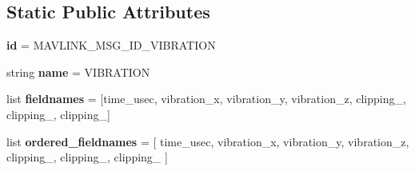 \subsection*{Static Public Attributes}
\begin{DoxyCompactItemize}
\item 
\mbox{\label{classpymavlink_1_1dialects_1_1v10_1_1MAVLink__vibration__message_aae3f0ffb631fe4f4b68b9c84e67de39c}} 
{\bfseries id} = M\+A\+V\+L\+I\+N\+K\+\_\+\+M\+S\+G\+\_\+\+I\+D\+\_\+\+V\+I\+B\+R\+A\+T\+I\+ON
\item 
\mbox{\label{classpymavlink_1_1dialects_1_1v10_1_1MAVLink__vibration__message_a869eb6823984ad248c9239fb7b1ba8c0}} 
string {\bfseries name} = \textquotesingle{}V\+I\+B\+R\+A\+T\+I\+ON\textquotesingle{}
\item 
\mbox{\label{classpymavlink_1_1dialects_1_1v10_1_1MAVLink__vibration__message_a4001662f3370f6ffdb24feb94920ec90}} 
list {\bfseries fieldnames} = \mbox{[}\textquotesingle{}time\+\_\+usec\textquotesingle{}, \textquotesingle{}vibration\+\_\+x\textquotesingle{}, \textquotesingle{}vibration\+\_\+y\textquotesingle{}, \textquotesingle{}vibration\+\_\+z\textquotesingle{}, \textquotesingle{}clipping\+\_\textquotesingle{}, \textquotesingle{}clipping\+\_\textquotesingle{}, \textquotesingle{}clipping\+\_\textquotesingle{}\mbox{]}
\item 
\mbox{\label{classpymavlink_1_1dialects_1_1v10_1_1MAVLink__vibration__message_a17de132382ff7fff44d5b36949663161}} 
list {\bfseries ordered\+\_\+fieldnames} = \mbox{[} \textquotesingle{}time\+\_\+usec\textquotesingle{}, \textquotesingle{}vibration\+\_\+x\textquotesingle{}, \textquotesingle{}vibration\+\_\+y\textquotesingle{}, \textquotesingle{}vibration\+\_\+z\textquotesingle{}, \textquotesingle{}clipping\+\_\textquotesingle{}, \textquotesingle{}clipping\+\_\textquotesingle{}, \textquotesingle{}clipping\+\_\textquotesingle{} \mbox{]}
\item 
\mbox{\label{classpymavlink_1_1dialects_1_1v10_1_1MAVLink__vibration__message_a246aa7a6a37a29ea3e86a0ab14e8bf92}} 

\end{DoxyCompactItemize}
